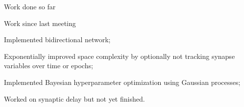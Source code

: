 \documentclass[t]{beamer}
\newcommand{\cmark}{\ding{51}}%
\newcommand{\done}{\rlap{$\square$}{\raisebox{2pt}{\large\hspace{1pt}\cmark}}%
\hspace{-2.5pt}}
\begin{document}
\begin{frame}{Work done so far}
\end{frame}


\begin{frame}{Work since last meeting}
	\begin{todolist}

    \item[\done] Implemented bidirectional network;
    \item[\done] Exponentially improved space complexity by optionally not tracking synapse variables over time or epochs;
    \item[\done] Implemented Bayesian hyperparameter optimization using Gaussian processes;
    \item Worked on synaptic delay but not yet finished.
  \end{todolist}
  
\end{frame}
\end{document}
